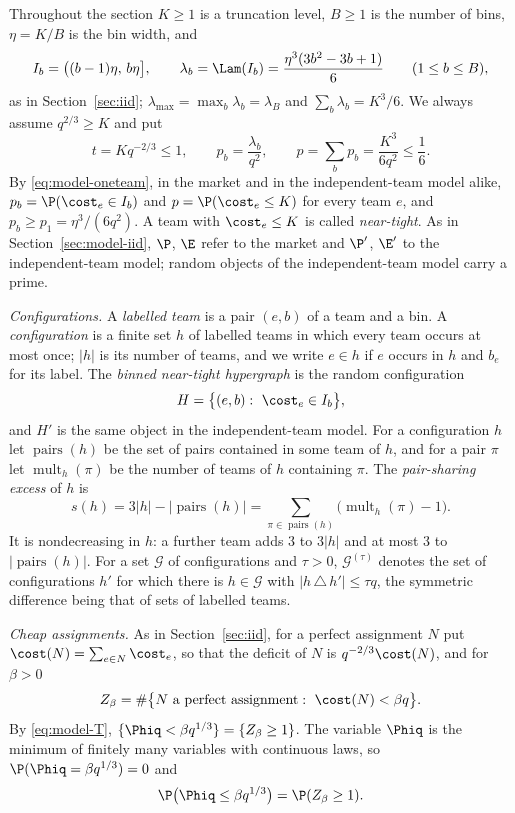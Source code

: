 Throughout the section $K\ge1$ is a truncation level, $B\ge1$ is the number of bins,
$\eta=K/B$ is the bin width, and
\[
I_b=\bigl((b-1)\eta,\,b\eta\bigr],\qquad
\lambda_b=\Lam(I_b)=\frac{\eta^3(3b^2-3b+1)}{6}\qquad(1\le b\le B),
\]
as in Section~\ref{sec:iid}; $\lambda_{\max}=\max_b\lambda_b=\lambda_B$ and
$\sum_b\lambda_b=K^3/6$. We always assume $q^{2/3}\ge K$ and put
\[
t=Kq^{-2/3}\le1,\qquad p_b=\frac{\lambda_b}{q^2},\qquad p=\sum_{b}p_b=\frac{K^3}{6q^2}\le\frac16 .
\]
By \eqref{eq:model-oneteam}, in the market and in the independent-team model alike,
$p_b=\P(\cost_e\in I_b)$ and $p=\P(\cost_e\le K)$ for every team $e$, and
$p_b\ge p_1=\eta^3/(6q^2)$. A team with $\cost_e\le K$ is called \emph{near-tight}. As in
Section~\ref{sec:model-iid}, $\P$, $\E$ refer to the market and $\P'$, $\E'$ to the
independent-team model; random objects of the independent-team model carry a prime.

\emph{Configurations.} A \emph{labelled team} is a pair $(e,b)$ of a team and a bin. A
\emph{configuration} is a finite set $h$ of labelled teams in which every team occurs at most
once; $|h|$ is its number of teams, and we write $e\in h$ if $e$ occurs in $h$ and $b_e$ for
its label. The \emph{binned near-tight hypergraph} is the random configuration
\[
H=\bigl\{(e,b):\ \cost_e\in I_b\bigr\},
\]
and $H'$ is the same object in the independent-team model. For a configuration $h$ let
$\operatorname{pairs}(h)$ be the set of pairs contained in some team of $h$, and for a pair
$\pi$ let $\operatorname{mult}_h(\pi)$ be the number of teams of $h$ containing $\pi$. The
\emph{pair-sharing excess} of $h$ is
\[
s(h)=3|h|-|\operatorname{pairs}(h)|=\sum_{\pi\in\operatorname{pairs}(h)}\bigl(\operatorname{mult}_h(\pi)-1\bigr).
\]
It is nondecreasing in $h$: a further team adds $3$ to $3|h|$ and at most $3$ to
$|\operatorname{pairs}(h)|$. For a set $\mathcal G$ of configurations and $\tau>0$,
$\mathcal G^{(\tau)}$ denotes the set of configurations $h'$ for which there is
$h\in\mathcal G$ with $|h\,\triangle\,h'|\le\tau q$, the symmetric difference being that of
sets of labelled teams.

\emph{Cheap assignments.} As in Section~\ref{sec:iid}, for a perfect assignment $N$ put
$\cost(N)=\sum_{e\in N}\cost_e$, so that the deficit of $N$ is $q^{-2/3}\cost(N)$, and for
$\beta>0$
\[
Z_\beta=\#\bigl\{N\ \text{a perfect assignment}:\ \cost(N)<\beta q\bigr\}.
\]
By \eqref{eq:model-T}, $\{\Phiq<\beta q^{1/3}\}=\{Z_\beta\ge1\}$. The variable $\Phiq$ is the
minimum of finitely many variables with continuous laws, so $\P(\Phiq=\beta q^{1/3})=0$ and
\begin{equation}\label{eq:transfer-Zevent}
\P\bigl(\Phiq\le\beta q^{1/3}\bigr)=\P(Z_\beta\ge1).
\end{equation}

